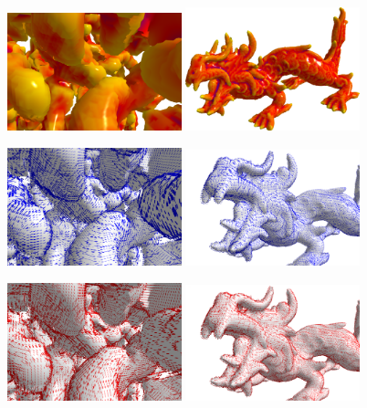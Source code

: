 \documentclass{llncs}
\begin{document}
 \begin{figure}[h!]
   \vspace{-0.35cm}
   \begin{center}
   	 {\includegraphics[width=0.45\textwidth]{figs/snow_r8}}
   	 {\includegraphics[width=0.45\textwidth]{figs/xyzrgb_dragon-510_R8_mean}}

     {\includegraphics[width=0.45\textwidth]{figs/snow_r8_min}}
	 {\includegraphics[width=0.45\textwidth]{figs/dragon_r8}}

     {\includegraphics[width=0.45\textwidth]{figs/snow_r8_max}}
	 {\includegraphics[width=0.45\textwidth]{figs/dragon_r8_max}}


\end{center}
\end{figure}
\end{document}
